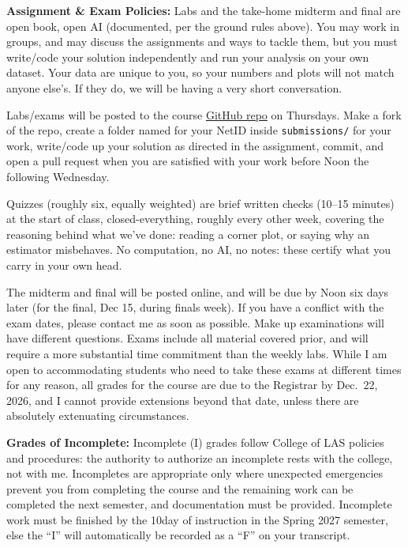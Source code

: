 {\bf \headerfont \color{RoyalBlue} Assignment \& Exam Policies:}
Labs and the take-home midterm and final are open book, open
AI (documented, per the ground rules above). You may work in groups, and may
discuss the assignments and ways to tackle them, but you must write/code your
solution independently and run your analysis on your own dataset. Your data
are unique to you, so your numbers and plots will not match anyone else's. If
they do, we will be having a very short conversation.

Labs/exams will be posted to the course
\href{https://github.com/gnarayan/ast457_2026_Fall}{GitHub repo} on Thursdays.
Make a fork of the repo, create a folder named for your NetID inside
\texttt{submissions/} for your work, write/code up your solution as directed
in the assignment, commit, and open a pull request when you are satisfied
with your work before Noon the following Wednesday.

Quizzes (roughly six, equally weighted) are brief written checks (10--15 minutes) at the start of class, closed-everything, roughly every other week, covering the reasoning behind what we've done: reading a corner plot, or saying why an estimator misbehaves. No computation, no AI, no notes: these certify what you carry in your own head.

The midterm and final will be posted online, and will be
due by Noon six days later (for the final, Dec 15, during finals week). If you have a
conflict with the exam dates, please contact me as soon as possible. Make up
examinations will have different questions. Exams include all material covered
prior, and will require a more substantial time commitment than the weekly
labs. While I am open to accommodating students who need to take these exams at different times for any reason, all grades for the course are due to
the Registrar by Dec.~22, 2026, and I cannot provide extensions beyond that
date, unless there are absolutely extenuating circumstances.
\medskip

{\bf \headerfont \color{RoyalBlue} Grades of Incomplete:}
Incomplete (I) grades follow College of LAS policies and procedures: the
authority to authorize an incomplete rests with the college, not with me.
Incompletes are appropriate only where unexpected emergencies prevent you from
completing the course and the remaining work can be completed the next
semester, and documentation must be provided. Incomplete work must
be finished by the 10\nth day of instruction in the Spring 2027 semester, else
the ``{\color{BurntOrange}I}'' will automatically be recorded as a
``{\color{Red}F}'' on your transcript.
\medskip

